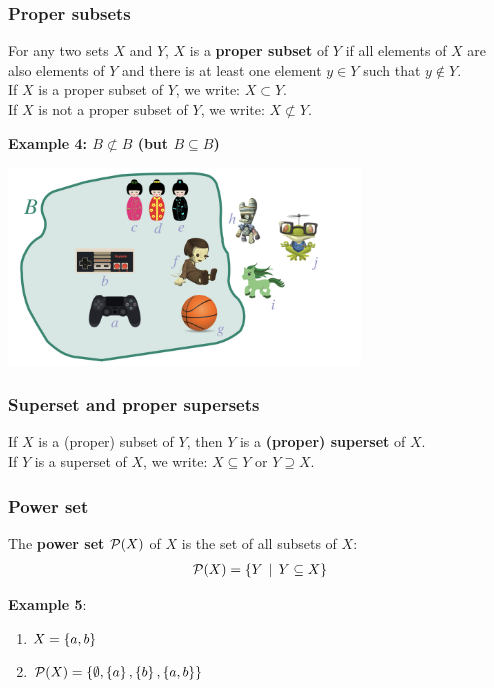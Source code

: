 \documentclass[fleqn,10pt,serif,xcolor=svgnames,xcolor=table,aspectratio=169]{beamer}
\begin{document}
\begin{frame}
  \frametitle{Proper subsets}

  For any two sets $X$ and $Y$, $X$ is a \textbf{proper subset} of $Y$ if all elements of $X$ are also elements of $Y$ and there is at least one element $y \in Y$ such that $y \not \in Y$.\\
  If $X$ is a proper subset of $Y$, we write: $X \subset Y$.\\
  If $X$ is not a proper subset of $Y$, we write: $X \not \subset Y$.



  \hfill \textbf{Example 4: $B \not \subset B$ (but $B \subseteq B$)}

  \hfill \includegraphics[width = 0.7\textwidth]{01b-sets-relations-operations/01b-sets-relations-operations-003.jpeg}

\end{frame}

\begin{frame}
  \frametitle{Superset and proper supersets}
  If $X$ is a (proper) subset of $Y$, then $Y$ is a \textbf{(proper) superset} of $X$.\\
  If $Y$ is a superset of $X$, we write: $X \subseteq Y$ or $Y \supseteq X$.
\end{frame}

\begin{frame}

\frametitle{Power set}

  The \textbf{power set} $\mathcal{P}(X)$ of $X$ is the set of all subsets of $X$:
  \begin{align*}
    \mathcal{P}(X) = \left\{Y \thinspace \mid \thinspace Y \subseteq X\right\}
  \end{align*}

  \bigskip

  \textbf{Example 5}:

    \begin{enumerate}[]
      \item $X = \left\{a,b\right\}$
      \item $\mathcal{P}(X) = \left\{\emptyset, \left\{a\right\}, \left\{b\right\}, \left\{a,b\right\}\right\}$
    \end{enumerate}

\end{frame}
\end{document}
